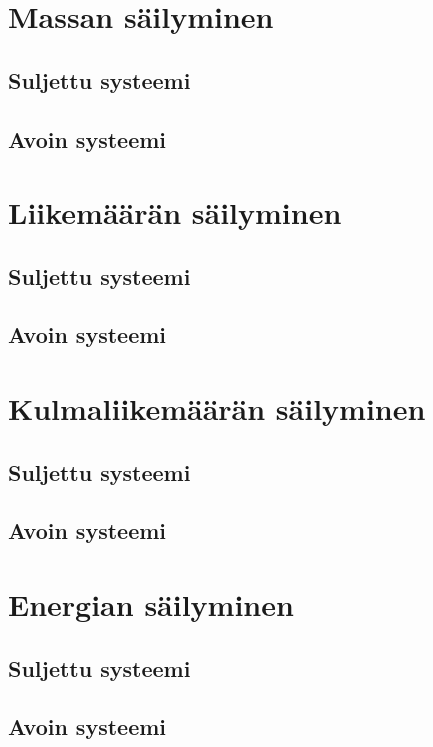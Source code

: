 \documentclass[12pt,a4paper,finnish]{book}
\begin{document}
\section{Massan säilyminen}

\subsection{Suljettu systeemi}

\subsection{Avoin systeemi}

\section{Liikemäärän säilyminen}

\subsection{Suljettu systeemi}

\subsection{Avoin systeemi}

\section{Kulmaliikemäärän säilyminen}

\subsection{Suljettu systeemi}

\subsection{Avoin systeemi}

\section{Energian säilyminen}

\subsection{Suljettu systeemi}

\subsection{Avoin systeemi}
\end{document}
